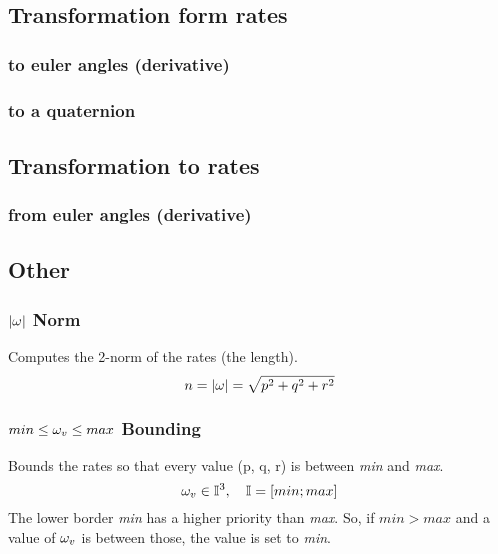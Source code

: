 \subsection{Transformation form rates}
\subsubsection*{to euler angles (derivative)}


\subsubsection*{to a quaternion}



\subsection{Transformation to rates}
\subsubsection*{from euler angles (derivative)}




\subsection{Other}
\subsubsection*{$|{\omega_{}}|$ Norm}
Computes the 2-norm of the rates (the length).
\begin{equation}
n = |{\omega_{}}| = \sqrt{p^2 +q^2+r^2}
\end{equation}

\subsubsection*{$min \leq \omega_{v} \leq max$ Bounding}
Bounds the rates so that every value (p, q, r) is between \textit{min} and \textit{max}.
\begin{equation}
\omega_{v} \in \mathbb{I}^3, \quad \mathbb{I} = [min; max]
\end{equation}
The lower border \textit{min} has a higher priority than \textit{max}. So, if $ min > max$ and a value of $ \omega_{v} $ is between those, the value is set to \textit{min}. \\

